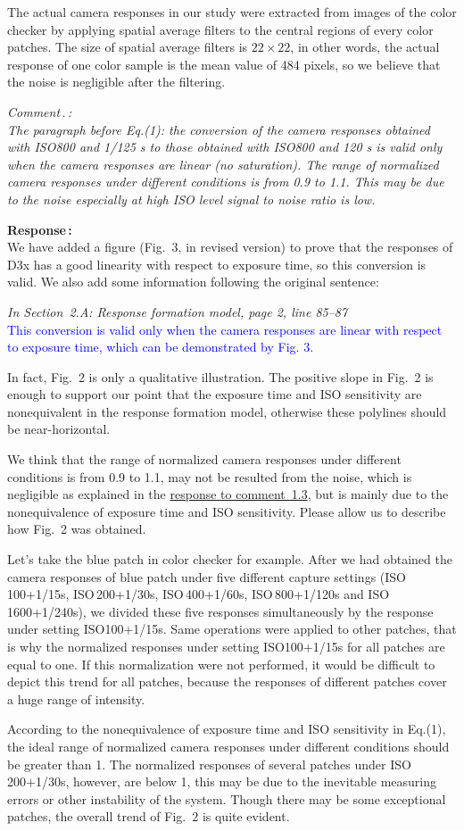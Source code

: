 \documentclass[12pt]{article}
\newcounter{comment}
\newcounter{subcomment}[comment]
\renewcommand{\thecomment}{Comment\,\arabic{comment}}
\renewcommand{\thesubcomment}{\thecomment.\arabic{subcomment}}
\newcommand{\subcomment}[1]{\stepcounter{subcomment} \bigskip \noindent 
	\textsl{{\fontseries{b}\selectfont \thesubcomment\,:}\medskip\\ #1}\smallskip\par}
\newcommand{\reply}[1]{\noindent \textbf{\fontseries{b}\selectfont Response\,:}\medskip\\#1\medskip\par}
\newcommand{\add}[1]{\noindent\textcolor{blue}{#1}}
\newcommand{\pos}[1]{\noindent\emph{\small#1}}
\begin{document}
		The actual camera responses in our study were extracted from images of the color checker by applying spatial average filters to the central regions of every color patches. The size of spatial average filters is $22\times22$, in other words, the actual response of one color sample is the mean value of 484 pixels, so we believe that the noise is negligible after the filtering.
		
	\subcomment{
		The paragraph before Eq.(1): the conversion of the camera responses obtained with ISO800 and 1/125 s to those obtained with ISO800 and 120 s is valid only when the camera responses are linear (no saturation). The range of normalized camera responses under different conditions is from 0.9 to 1.1. This may be due to the noise especially at high ISO level signal to noise ratio is low.}
	
	\reply{
		We have added a figure (Fig.~3, in revised version) to prove that the responses of D3x has a good linearity with respect to exposure time, so this conversion is valid. We also add some information following the original sentence:
		
		\pos{In Section~2.A: Response formation model, page 2, line 85--87}\\
		\add{This conversion is valid only when the camera responses are linear with respect to exposure time, which can be demonstrated by Fig. 3}.
		
		In fact, Fig.~2 is only a qualitative illustration. The positive slope in Fig.~2 is enough to support our point that the exposure time and ISO sensitivity are nonequivalent in the response formation model, otherwise these polylines should be near-horizontal.
		
		We think that the range of normalized camera responses under different conditions is from 0.9 to 1.1, may not be resulted from the noise, which is negligible as explained in the \hyperlink{comment1.3}{response to comment~1.3}, but is mainly due to the nonequivalence of exposure time and ISO sensitivity. Please allow us to describe how Fig.~2 was obtained.
		
		Let's take the blue patch in color checker for example. After we had obtained the camera responses of blue patch under five different capture settings (ISO\,100+1/15s, ISO\,200+1/30s, ISO\,400+1/60s, ISO\,800+1/120s and ISO\,1600+1/240s), we divided these five responses simultaneously by the response under setting ISO100+1/15s. Same operations were applied to other patches, that is why the normalized responses under setting ISO100+1/15s for all patches are equal to one. If this normalization were not performed, it would be difficult to depict this trend for all patches, because the responses of different patches cover a huge range of intensity.
		
		According to the nonequivalence of exposure time and ISO sensitivity in Eq.(1), the ideal range of normalized camera responses under different conditions should be greater than 1. The normalized responses of several patches under ISO\,200+1/30s, however, are below 1, this may be due to the inevitable measuring errors or other instability of the system. Though there may be some exceptional patches, the overall trend of Fig.~2 is quite evident.}
	
\end{document}
